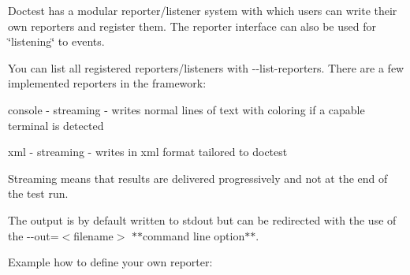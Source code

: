 Doctest has a modular reporter/listener system with which users can write their own reporters and register them. The reporter interface can also be used for \char`\"{}listening\char`\"{} to events.

You can list all registered reporters/listeners with {\ttfamily -\/-\/list-\/reporters}. There are a few implemented reporters in the framework\+:
\begin{DoxyItemize}
\item {\ttfamily console} -\/ streaming -\/ writes normal lines of text with coloring if a capable terminal is detected
\item {\ttfamily xml} -\/ streaming -\/ writes in xml format tailored to doctest
\end{DoxyItemize}

Streaming means that results are delivered progressively and not at the end of the test run.

The output is by default written to {\ttfamily stdout} but can be redirected with the use of the {\ttfamily -\/-\/out=$<$filename$>$} $\ast$$\ast$command line option$\ast$$\ast$.

Example how to define your own reporter\+:


